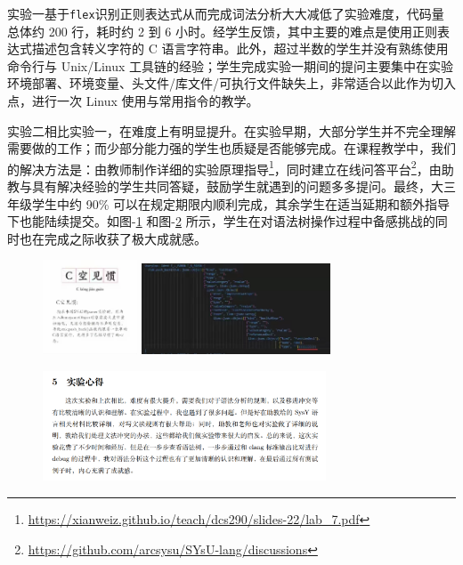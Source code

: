 \documentclass{SCIS2020cn}
\begin{document}

实验一基于\texttt{flex}识别正则表达式从而完成词法分析大大减低了实验难度，代码量总体约 200 行，耗时约 2 到 6 小时。经学生反馈，其中主要的难点是使用正则表达式描述包含转义字符的 C 语言字符串。此外，超过半数的学生并没有熟练使用命令行与 Unix/Linux 工具链的经验；学生完成实验一期间的提问主要集中在实验环境部署、环境变量、头文件/库文件/可执行文件缺失上，非常适合以此作为切入点，进行一次 Linux 使用与常用指令的教学。

实验二相比实验一，在难度上有明显提升。在实验早期，大部分学生并不完全理解需要做的工作；而少部分能力强的学生也质疑是否能够完成。在课程教学中，我们的解决方法是：由教师制作详细的实验原理指导\footnote{\url{https://xianweiz.github.io/teach/dcs290/slides-22/lab_7.pdf}}，同时建立在线问答平台\footnote{\url{https://github.com/arcsysu/SYsU-lang/discussions}}，由助教与具有解决经验的学生共同答疑，鼓励学生就遇到的问题多多提问。最终，大三年级学生中约 90\% 可以在规定期限内顺利完成，其余学生在适当延期和额外指导下也能陆续提交。如图-\ref{tucao} 和图-\ref{report2} 所示，学生在对语法树操作过程中备感挑战的同时也在完成之际收获了极大成就感。

\begin{figure}
    \centering
    \includegraphics[width=0.25\textwidth]{assets/image/tucao.jpg}
    \includegraphics[width=0.5\textwidth]{assets/image/tucao1.jpg}
    \label{tucao}
\end{figure}

\begin{figure}
    \centering
    \includegraphics[width=0.75\textwidth]{assets/image/report2}
    \label{report2}
\end{figure}
\end{document}
